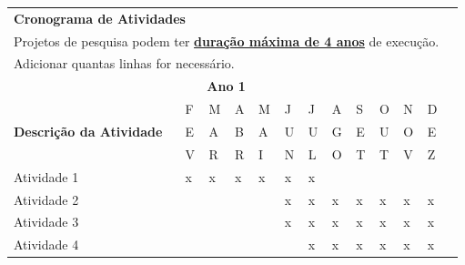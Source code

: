 \documentclass[
  12pt,				
  openright,	
  twoside,	
  a4paper,
  brazil,	
  oldfontcommands,
  ]{abntex2}
\begin{document}
\begin{table}[H]
\begin{center}
\begin{tabularx}{\textwidth}{|p{10cm}|X|X|X|X|X|X|X|X|X|X|X|X|}
\multicolumn{12}{l}{\textbf{Cronograma de Atividades}} \\
\multicolumn{12}{l}{\footnotesize Projetos de pesquisa podem ter \underline{\textbf{dura\c{c}\~{a}o m\'{a}xima de 4 anos}} de execu\c{c}\~{a}o.} \\
\multicolumn{12}{l}{\footnotesize Adicionar quantas linhas for necessário.} \\
\hline
\multicolumn{12}{|c|}{\cellcolor{green} \textbf{Ano 1}} \\\hline
\multirow{3}{*}{\textbf{Descri\c{c}\~{a}o da Atividade}} 
                                                         	& F & M & A & M & J & J & A & S & O & N & D \\
                                                         	& E & A & B & A & U & U & G & E & U & O & E \\
                                                         	& V & R & R & I & N & L & O & T & T & V & Z \\\hline
Atividade 1     					& x & x & x & x & x & x  &   &   &   &   &   \\\hline
Atividade 2                                       	&   &   &   &   & x &  x & x  & x  & x  & x  & x  \\\hline
Atividade 3	                               	&   &   &   &   & x & x & x & x  & x  & x  & x  \\\hline
Atividade 4	                                  &   &   &   &   &   &  x &  x &  x & x  & x  & x  \\\hline
\end{tabularx}
\end{center}
\end{table}
\vspace{-10mm}
\end{document}
